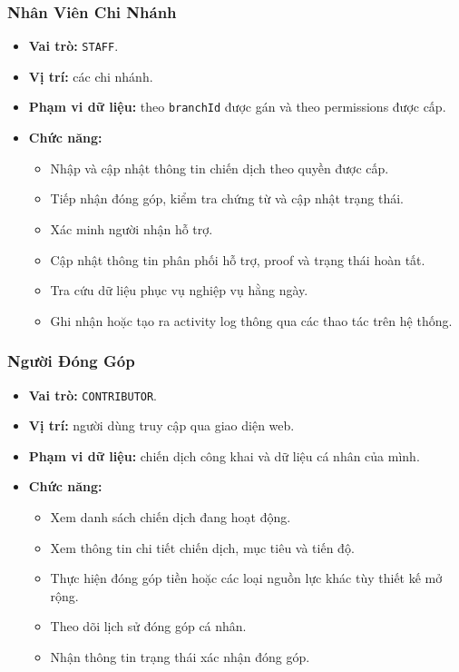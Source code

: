 \documentclass[12pt,a4paper]{article}
\begin{document}
\subsubsection{Nhân Viên Chi Nhánh}
\begin{itemize}
\item \textbf{Vai trò:} \texttt{STAFF}.
\item \textbf{Vị trí:} các chi nhánh.
\item \textbf{Phạm vi dữ liệu:} theo \texttt{branchId} được gán và theo permissions được cấp.
\item \textbf{Chức năng:}
\begin{itemize}
\item Nhập và cập nhật thông tin chiến dịch theo quyền được cấp.
\item Tiếp nhận đóng góp, kiểm tra chứng từ và cập nhật trạng thái.
\item Xác minh người nhận hỗ trợ.
\item Cập nhật thông tin phân phối hỗ trợ, proof và trạng thái hoàn tất.
\item Tra cứu dữ liệu phục vụ nghiệp vụ hằng ngày.
\item Ghi nhận hoặc tạo ra activity log thông qua các thao tác trên hệ thống.
\end{itemize}
\end{itemize}
\subsubsection{Người Đóng Góp}
\begin{itemize}
\item \textbf{Vai trò:} \texttt{CONTRIBUTOR}.
\item \textbf{Vị trí:} người dùng truy cập qua giao diện web.
\item \textbf{Phạm vi dữ liệu:} chiến dịch công khai và dữ liệu cá nhân của mình.
\item \textbf{Chức năng:}
\begin{itemize}
\item Xem danh sách chiến dịch đang hoạt động.
\item Xem thông tin chi tiết chiến dịch, mục tiêu và tiến độ.
\item Thực hiện đóng góp tiền hoặc các loại nguồn lực khác tùy thiết kế mở rộng.
\item Theo dõi lịch sử đóng góp cá nhân.
\item Nhận thông tin trạng thái xác nhận đóng góp.
\end{itemize}
\end{itemize}
\end{document}

